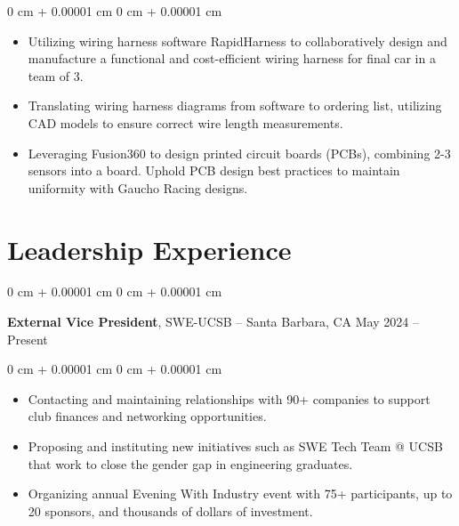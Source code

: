\documentclass[10pt, letterpaper]{article}
\newenvironment{highlights}{
    \begin{itemize}[
        topsep=0.10 cm,
        parsep=0.10 cm,
        partopsep=0pt,
        itemsep=0pt,
        leftmargin=0 cm + 10pt
    ]
}{
    \end{itemize}
} %
\newenvironment{onecolentry}{
    \begin{adjustwidth}{
        0 cm + 0.00001 cm
    }{
        0 cm + 0.00001 cm
    }
}{
    \end{adjustwidth}
} %
\newenvironment{twocolentry}[2][]{
    \onecolentry
    \def\secondColumn{#2}
    \setcolumnwidth{\fill, 4.5 cm}
    \begin{paracol}{2}
}{
    \switchcolumn \raggedleft \secondColumn
    \end{paracol}
    \endonecolentry
} %
\begin{document}
        \vspace{0.10 cm}
        \begin{onecolentry}
            \begin{highlights}
                \item Utilizing wiring harness software RapidHarness to collaboratively design and manufacture a functional and cost-efficient wiring harness for final car in a team of 3.
                \item Translating wiring harness diagrams from software to ordering list, utilizing CAD models to ensure correct wire length measurements. 
                \item Leveraging Fusion360 to design printed circuit boards (PCBs), combining 2-3 sensors into a board. Uphold PCB design best practices to maintain uniformity with Gaucho Racing designs.
            \end{highlights}
        \end{onecolentry}


        \vspace{0.2 cm}

    \section{Leadership Experience}

        \begin{twocolentry}{
            May 2024 – Present
        }
            \textbf{External Vice President}, SWE-UCSB -- Santa Barbara, CA\end{twocolentry}

        \vspace{0.10 cm}
        \begin{onecolentry}
            \begin{highlights}
                \item Contacting and maintaining relationships with 90+ companies to support club finances and networking opportunities.
                \item Proposing and instituting new initiatives such as SWE Tech Team @ UCSB that work to close the gender gap in engineering graduates.
                \item Organizing annual Evening With Industry event with 75+ participants, up to 20 sponsors, and thousands of dollars of investment.
            \end{highlights}
        \end{onecolentry}
\end{document}
